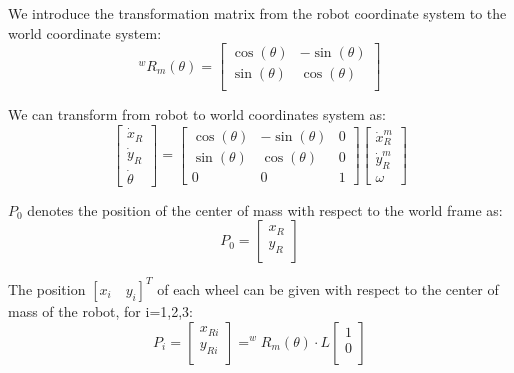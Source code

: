 We introduce the transformation matrix from the robot coordinate system to the world coordinate system:
\begin{equation}
^wR_m(\theta)=\begin{bmatrix}
\cos(\theta) &-\sin(\theta)\\
\sin(\theta) & \cos(\theta)\\
\end{bmatrix}
\end{equation}

We can transform from robot to world coordinates system as:
\begin{equation}
\begin{bmatrix}
\dot{x}_R\\
\dot{y}_R\\
\dot{\theta}
\end{bmatrix} =
\begin{bmatrix}
\cos(\theta) &-\sin(\theta) & 0\\
\sin(\theta) & \cos(\theta) & 0\\
0 & 0 & 1
\end{bmatrix}
\begin{bmatrix}
\dot{x}^m_R\\
\dot{y}^m_R\\
\omega
\end{bmatrix}
\label{eq:rotation}
\end{equation}

$P_0$ denotes the position of the center of mass with respect to the world frame as:
\begin{equation}
P_0 = 	\begin{bmatrix}
x_R\\
y_R\\
\end{bmatrix}
\end{equation}

The position $[x_i\quad y_i]^T$ of each wheel can be given with respect to the center of mass of the robot, for i=1,2,3:
\begin{equation}
P_i = 	\begin{bmatrix}
x_{Ri}\\
y_{Ri}\\
\end{bmatrix} = 
^wR_m(\theta)\cdot L
\begin{bmatrix}
1\\
0\\
\end{bmatrix}
\end{equation}

